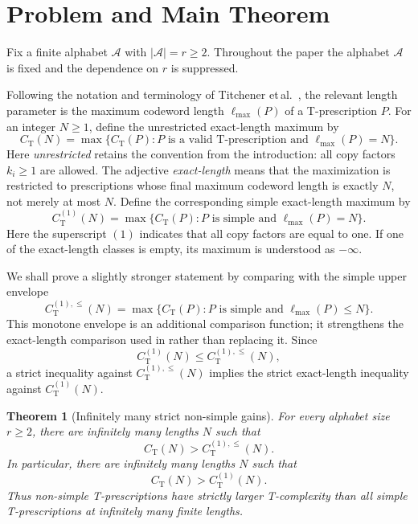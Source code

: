 \documentclass[11pt]{article}
\newtheorem{theorem}{Theorem}
\newcommand{\A}{\mathcal A}
\newcommand{\CT}{C_{\mathrm T}}
\newcommand{\CTsimp}{C_{\mathrm T}^{(1)}}
\newcommand{\CTsimpenv}{C_{\mathrm T}^{(1),\leq}}
\newcommand{\ellmax}{\ell_{\max}}
\begin{document}
\section{Problem and Main Theorem}

Fix a finite alphabet $\A$ with $|\A|=r\geq 2$. Throughout the paper the alphabet $\A$ is fixed and the dependence on $r$ is suppressed.

Following the notation and terminology of Titchener et\,al.~\cite{TitchenerEtAl2005},
the relevant length parameter is the maximum codeword length \(\ellmax(P)\) of a
T-prescription \(P\). For an integer \(N\ge 1\), define the unrestricted
exact-length maximum by
\begin{equation}
	\CT(N)=\max\{\CT(P): P\text{ is a valid T-prescription and }\ellmax(P)=N\}.
\end{equation}
Here \emph{unrestricted} retains the convention from the introduction: all copy factors $k_i\geq 1$ are allowed. The adjective \emph{exact-length} means that the maximization is restricted to prescriptions whose final maximum codeword length is exactly $N$, not merely at most $N$.
Define the corresponding simple exact-length maximum by
\begin{equation}
\CTsimp(N)=\max\{\CT(P): P\text{ is simple and }\ellmax(P)=N\}.
\end{equation}
Here the superscript $(1)$ indicates that all copy factors are equal to one. If one of the exact-length classes is empty, its maximum is understood as $-\infty$.

We shall prove a slightly stronger statement by comparing with the simple upper envelope
\begin{equation}
\CTsimpenv(N)=\max\{\CT(P): P\text{ is simple and }\ellmax(P)\leq N\}.
\end{equation}
This monotone envelope is an additional comparison function; it strengthens the exact-length comparison used in \cite{TitchenerEtAl2005} rather than replacing it. Since
\begin{equation}
\CTsimp(N)\leq \CTsimpenv(N),
\end{equation}
a strict inequality against $\CTsimpenv(N)$ implies the strict exact-length inequality against $\CTsimp(N)$.

\begin{theorem}[Infinitely many strict non-simple gains]
\label{thm:main}
For every alphabet size $r\geq 2$, there are infinitely many lengths $N$ such that
\begin{equation}
\CT(N)>\CTsimpenv(N).
\end{equation}
In particular, there are infinitely many lengths $N$ such that
\begin{equation}
\CT(N)>\CTsimp(N).
\end{equation}
Thus non-simple T-prescriptions have strictly larger T-complexity than all simple T-prescriptions at infinitely many finite lengths.
\end{theorem}
\end{document}
